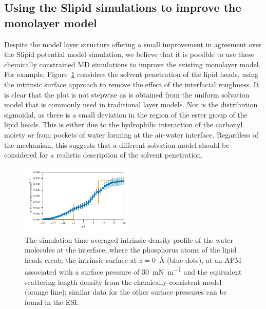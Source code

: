 \documentclass[amsmath,amssymb,twocolumn,superscriptaddress]{revtex4-1}
\begin{document}
\subsection{Using the Slipid simulations to improve the monolayer model}
Despite the model layer structure offering a small improvement in agreement over the Slipid potential model simulation, we believe that it is possible to use these chemically constrained MD simulations to improve the existing monolayer model.
For example, Figure~\ref{fig:waters} considers the solvent penetration of the lipid heads, using the intrinsic surface approach to remove the effect of the interfacial roughness.
It is clear that the plot is not stepwise as is obtained from the uniform solvation model that is commonly used in traditional layer models.
Nor is the distribution sigmoidal, as there is a small deviation in the region of the ester group of the lipid heads.
This is either due to the hydrophilic interaction of the carbonyl moiety or from pockets of water forming at the air-water interface.
Regardless of the mechanism, this suggests that a different solvation model should be considered for a realistic description of the solvent penetration.
%
\begin{figure}
\centering
  \includegraphics[width=0.48\textwidth]{water_30}
  \caption{The simulation time-averaged intrinsic density profile of the water molecules at the interface, where the phosphorus atoms of the lipid heads create the intrinsic surface at $z=$\SI{0}{\angstrom} (blue dots), at an APM associated with a surface pressure of \SI{30}{\milli\newton\per\meter} and the equivalent scattering length density from the chemically-consistent model (orange line); similar data for the other surface pressures can be found in the ESI.}
  \label{fig:waters}
\end{figure}
%
\end{document}
